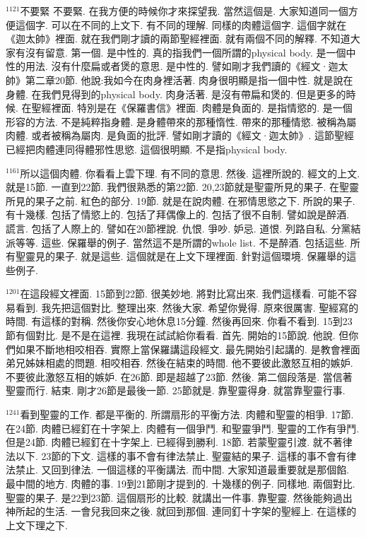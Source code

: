 \documentclass{book}
\begin{document}
$^{1121}$不要緊 不要緊.
在我方便的時候你才來探望我.
當然這個是.
大家知道同一個方便這個字.
可以在不同的上文下.
有不同的理解.
同樣的肉體這個字.
這個字就在《迦太帥》裡面.
就在我們剛才讀的兩節聖經裡面.
就有兩個不同的解釋.
不知道大家有沒有留意.
第一個.
是中性的.
真的指我們一個所謂的physical body.
是一個中性的用法.
沒有什麼扁或者煲的意思.
是中性的.
譬如剛才我們讀的《經文·迦太帥》第二章20節.
他說:我如今在肉身裡活著.
肉身很明顯是指一個中性.
就是說在身體.
在我們見得到的physical body.
肉身活著.
是沒有帶扁和煲的.
但是更多的時候.
在聖經裡面.
特別是在《保羅書信》裡面.
肉體是負面的.
是指情慾的.
是一個形容的方法.
不是純粹指身體.
是身體帶來的那種惰性.
帶來的那種情慾.
被稱為屬肉體.
或者被稱為屬肉.
是負面的批評.
譬如剛才讀的《經文·迦太帥》.
這節聖經已經把肉體連同得體邪性思慾.
這個很明顯.
不是指physical body.

$^{1161}$所以這個肉體.
你看看上雲下理.
有不同的意思.
然後.
這裡所說的.
經文的上文.
就是15節.
一直到22節.
我們很熟悉的第22節.
20,23節就是聖靈所見的果子.
在聖靈所見的果子之前.
紅色的部分.
19節.
就是在說肉體.
在邪情思慾之下.
所說的果子.
有十幾樣.
包括了情慾上的.
包括了拜偶像上的.
包括了很不自制.
譬如說是醉酒.
謊言.
包括了人際上的.
譬如在20節裡說.
仇恨.
爭吵.
妒忌.
道恨.
列路自私.
分黨結派等等.
這些.
保羅舉的例子.
當然這不是所謂的whole list.
不是醉酒.
包括這些.
所有聖靈見的果子.
就是這些.
這個就是在上文下理裡面.
針對這個環境.
保羅舉的這些例子.

$^{1201}$在這段經文裡面.
15節到22節.
很美妙地.
將對比寫出來.
我們這樣看.
可能不容易看到.
我先把這個對比.
整理出來.
然後大家.
希望你覺得.
原來很厲害.
聖經寫的時間.
有這樣的對稱.
然後你安心地休息15分鐘.
然後再回來.
你看不看到.
15到23節有個對比.
是不是在這裡.
我現在試試給你看看.
首先.
開始的15節說.
他說.
但你們如果不斷地相咬相吞.
實際上當保羅講這段經文.
最先開始引起講的.
是教會裡面弟兄姊妹相處的問題.
相咬相吞.
然後在結束的時間.
他不要彼此激怒互相的嫉妒.
不要彼此激怒互相的嫉妒.
在26節.
即是超越了23節.
然後.
第二個段落是.
當信著聖靈而行.
結束.
剛才26節是最後一節.
25節就是.
靠聖靈得身.
就當靠聖靈行事.

$^{1241}$看到聖靈的工作.
都是平衡的.
所謂扇形的平衡方法.
肉體和聖靈的相爭.
17節.
在24節.
肉體已經釘在十字架上.
肉體有一個爭鬥.
和聖靈爭鬥.
聖靈的工作有爭鬥.
但是24節.
肉體已經釘在十字架上.
已經得到勝利.
18節.
若蒙聖靈引渡.
就不著律法以下.
23節的下文.
這樣的事不會有律法禁止.
聖靈結的果子.
這樣的事不會有律法禁止.
又回到律法.
一個這樣的平衡講法.
而中間.
大家知道最重要就是那個餡.
最中間的地方.
肉體的事.
19到21節剛才提到的.
十幾樣的例子.
同樣地.
兩個對比.
聖靈的果子.
是22到23節.
這個扇形的比較.
就講出一件事.
靠聖靈.
然後能夠過出神所起的生活.
一會兒我回來之後.
就回到那個.
連同釘十字架的聖經上.
在這樣的上文下理之下.
\end{document}
